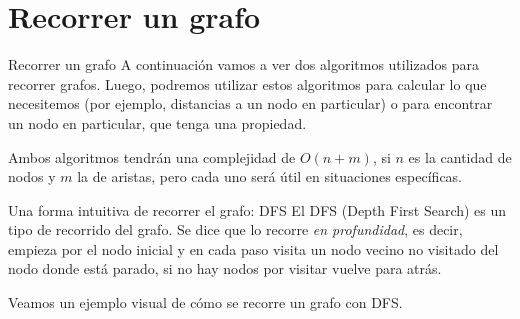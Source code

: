 \documentclass[compress]{beamer}
\begin{document}
\section{Recorrer un grafo}
\begin{frame}{Recorrer un grafo}
A continuación vamos a ver dos algoritmos utilizados para recorrer grafos. Luego, podremos utilizar estos algoritmos para calcular lo que necesitemos (por ejemplo, distancias a un nodo en particular) o para encontrar un nodo en particular, que tenga una propiedad.

\bigskip
Ambos algoritmos tendrán una complejidad de $O(n+m)$, si $n$ es la cantidad de nodos y $m$ la de aristas, pero cada uno será útil en situaciones específicas.
\end{frame}


\begin{frame}{Una forma intuitiva de recorrer el grafo: DFS}
El DFS (Depth First Search) es un tipo de recorrido del grafo. Se dice que lo recorre \textit{en profundidad}, es decir, empieza por el nodo inicial y en cada paso visita un nodo vecino no visitado del nodo donde está parado, si no hay nodos por visitar vuelve para atrás.

\bigskip
Veamos un ejemplo visual de cómo se recorre un grafo con DFS.
\end{frame}
\end{document}
